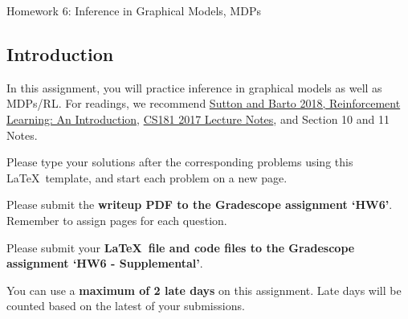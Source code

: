 \documentclass[submit]{harvardml}
\begin{document}
\begin{center}
{\Large Homework 6: Inference in Graphical Models, MDPs}\\
\end{center}

\subsection*{Introduction}

In this assignment, you will practice inference in graphical models as
well as MDPs/RL.  For readings, we recommend \href{http://incompleteideas.net/book/the-book-2nd.html}{Sutton and Barto 2018, Reinforcement Learning: An Introduction}, \href{https://harvard-ml-courses.github.io/cs181-web-2017/}{CS181 2017 Lecture Notes}, and Section 10 and 11 Notes.

Please type your solutions after the corresponding problems using this
\LaTeX\ template, and start each problem on a new page.

Please submit the \textbf{writeup PDF to the Gradescope assignment `HW6'}. Remember to assign pages for each question.

Please submit your \textbf{\LaTeX\ file and code files to the Gradescope assignment `HW6 - Supplemental'}. 

You can use a \textbf{maximum of 2 late days} on this assignment.  Late days will be counted based on the latest of your submissions. 
\\

\newpage
\end{document}
